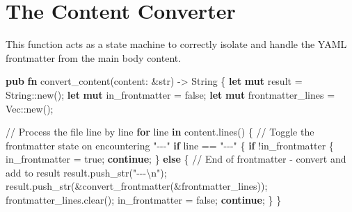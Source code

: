 \documentclass[
  letterpaper,
  DIV=11,
  numbers=noendperiod]{scrreprt}
\newenvironment{Shaded}{\begin{snugshade}}{\end{snugshade}}
\newcommand{\CommentTok}[1]{\textcolor[rgb]{0.37,0.37,0.37}{#1}}
\newcommand{\ConstantTok}[1]{\textcolor[rgb]{0.56,0.35,0.01}{#1}}
\newcommand{\ControlFlowTok}[1]{\textcolor[rgb]{0.00,0.23,0.31}{\textbf{#1}}}
\newcommand{\DataTypeTok}[1]{\textcolor[rgb]{0.68,0.00,0.00}{#1}}
\newcommand{\KeywordTok}[1]{\textcolor[rgb]{0.00,0.23,0.31}{\textbf{#1}}}
\newcommand{\NormalTok}[1]{\textcolor[rgb]{0.00,0.23,0.31}{#1}}
\newcommand{\OperatorTok}[1]{\textcolor[rgb]{0.37,0.37,0.37}{#1}}
\newcommand{\PreprocessorTok}[1]{\textcolor[rgb]{0.68,0.00,0.00}{#1}}
\newcommand{\SpecialCharTok}[1]{\textcolor[rgb]{0.37,0.37,0.37}{#1}}
\newcommand{\StringTok}[1]{\textcolor[rgb]{0.13,0.47,0.30}{#1}}
\begin{document}
\section{The Content Converter}\label{the-content-converter}

This function acts as a state machine to correctly isolate and handle
the YAML frontmatter from the main body content.

\begin{Shaded}
\begin{Highlighting}[]
\KeywordTok{pub} \KeywordTok{fn}\NormalTok{ convert\_content(content}\OperatorTok{:} \OperatorTok{\&}\DataTypeTok{str}\NormalTok{) }\OperatorTok{{-}\textgreater{}} \DataTypeTok{String} \OperatorTok{\{}
    \KeywordTok{let} \KeywordTok{mut}\NormalTok{ result }\OperatorTok{=} \DataTypeTok{String}\PreprocessorTok{::}\NormalTok{new()}\OperatorTok{;}
    \KeywordTok{let} \KeywordTok{mut}\NormalTok{ in\_frontmatter }\OperatorTok{=} \ConstantTok{false}\OperatorTok{;}
    \KeywordTok{let} \KeywordTok{mut}\NormalTok{ frontmatter\_lines }\OperatorTok{=} \DataTypeTok{Vec}\PreprocessorTok{::}\NormalTok{new()}\OperatorTok{;}

    \CommentTok{// Process the file line by line}
    \ControlFlowTok{for}\NormalTok{ line }\KeywordTok{in}\NormalTok{ content}\OperatorTok{.}\NormalTok{lines() }\OperatorTok{\{}
        \CommentTok{// Toggle the frontmatter state on encountering "{-}{-}{-}"}
        \ControlFlowTok{if}\NormalTok{ line }\OperatorTok{==} \StringTok{"{-}{-}{-}"} \OperatorTok{\{}
            \ControlFlowTok{if} \OperatorTok{!}\NormalTok{in\_frontmatter }\OperatorTok{\{}
\NormalTok{                in\_frontmatter }\OperatorTok{=} \ConstantTok{true}\OperatorTok{;}
                \ControlFlowTok{continue}\OperatorTok{;}
            \OperatorTok{\}} \ControlFlowTok{else} \OperatorTok{\{}
                \CommentTok{// End of frontmatter {-} convert and add to result}
\NormalTok{                result}\OperatorTok{.}\NormalTok{push\_str(}\StringTok{"{-}{-}{-}}\SpecialCharTok{\textbackslash{}n}\StringTok{"}\NormalTok{)}\OperatorTok{;}
\NormalTok{                result}\OperatorTok{.}\NormalTok{push\_str(}\OperatorTok{\&}\NormalTok{convert\_frontmatter(}\OperatorTok{\&}\NormalTok{frontmatter\_lines))}\OperatorTok{;}
\NormalTok{                frontmatter\_lines}\OperatorTok{.}\NormalTok{clear()}\OperatorTok{;}
\NormalTok{                in\_frontmatter }\OperatorTok{=} \ConstantTok{false}\OperatorTok{;} 
                \ControlFlowTok{continue}\OperatorTok{;}
            \OperatorTok{\}}
        \OperatorTok{\}}


\end{Highlighting}
\end{Shaded}
\end{document}
